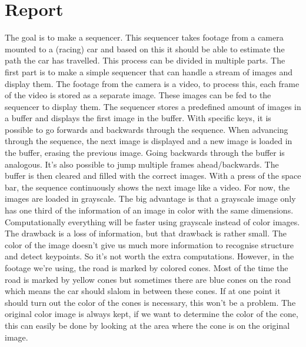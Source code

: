 \chapter{Report}

The goal is to make a sequencer. This sequencer takes footage from a camera mounted to a (racing) car and based on this it should be able to estimate the path the car has travelled. This process can be divided in multiple parts. The first part is to make a simple sequencer that can handle a stream of images and display them. The footage from the camera is a video, to process this, each frame of the video is stored as a separate image. These images can be fed to the sequencer to display them. The sequencer stores a predefined amount of images in a buffer and displays the first image in the buffer. With specific keys, it is possible to go forwards and backwards through the sequence. When advancing through the sequence, the next image is displayed and a new image is loaded in the buffer, erasing the previous image. Going backwards through the buffer is analogous. It's also possible to jump multiple frames ahead/backwards. The buffer is then cleared and filled with the correct images. With a press of the space bar, the sequence continuously shows the next image like a video.  For now, the images are loaded in grayscale. The big advantage is that a grayscale image only has one third of the information of an image in color with the same dimensions. Computationally everything will be faster using grayscale instead of color images. The drawback is a loss of information, but that drawback is rather small. The color of the image doesn't give us much more information to recognise structure and detect keypoints. So it's not worth the extra computations. However, in the footage we're using, the road is marked by colored cones. Most of the time the road is marked by yellow cones but sometimes there are blue cones on the road which means the car should slalom in between these cones. If at one point it should turn out the color of the cones is necessary, this won't be a problem. The original color image is always kept, if we want to determine the color of the cone, this can easily be done by looking at the area where the cone is on the original image.


